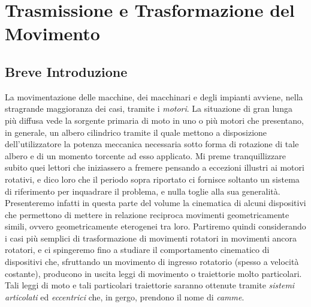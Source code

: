 \part{Trasmissione e Trasformazione del Movimento }
\chapter{Breve Introduzione}

La movimentazione delle macchine, dei macchinari e degli impianti avviene, nella stragrande maggioranza dei casi,
tramite i {\em motori}. La situazione di gran lunga pi\`u diffusa
vede la sorgente primaria di moto in uno o pi\`u
motori che presentano, in generale,  un albero cilindrico tramite il quale
mettono a disposizione dell'utilizzatore
la potenza meccanica necessaria sotto forma di rotazione di tale albero e di un momento torcente ad esso applicato.
Mi preme tranquillizzare subito quei lettori che iniziassero a fremere
pensando a eccezioni 
illustri ai motori rotativi, e dico loro che il periodo  sopra riportato ci
fornisce soltanto un sistema di
riferimento per inquadrare il problema, e nulla toglie alla sua generalit\`a.
Presenteremo infatti in questa parte del volume
la cinematica di alcuni dispositivi che permettono  di
mettere in relazione reciproca movimenti geometricamente
simili, ovvero geometricamente eterogenei tra loro.
Partiremo  quindi
considerando i casi pi\`u semplici di trasformazione di
movimenti rotatori in movimenti ancora rotatori, e ci spingeremo fino a
studiare il comportamento cinematico
di dispositivi che, sfruttando un movimento di ingresso rotatorio
(spesso a velocit\`a costante), producono in uscita leggi di movimento o traiettorie
molto particolari.
Tali leggi di moto e tali particolari traiettorie saranno ottenute tramite
{\em sistemi articolati}
ed {\em eccentrici} che, in gergo, 
prendono il nome di {\em camme}.

